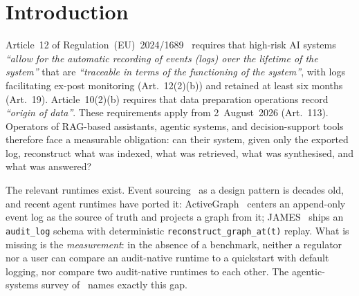 \documentclass[11pt,a4paper]{article}
\begin{document}
\begin{abstract}
DOI~\href{https://doi.org/10.5281/zenodo.20635130}{10.5281/zenodo.20635130}; both are reproducible bit-for-bit from the JAMES repository (tag \texttt{v0.4.3} for the software archive; commit \texttt{753022b} for the scenario-S2 measurement).
\end{abstract}

\section{Introduction}
\label{sec:intro}

Article~12 of Regulation~(EU)~2024/1689~\cite{aiact2024} requires that high-risk AI systems \emph{``allow for the automatic recording of events (logs) over the lifetime of the system''} that are \emph{``traceable in terms of the functioning of the system''}, with logs facilitating ex-post monitoring (Art.~12(2)(b)) and retained at least six months (Art.~19). Article~10(2)(b) requires that data preparation operations record \emph{``origin of data''}. These requirements apply from 2~August~2026 (Art.~113). Operators of RAG-based assistants, agentic systems, and decision-support tools therefore face a measurable obligation: can their system, given only the exported log, reconstruct what was indexed, what was retrieved, what was synthesised, and what was answered?

The relevant runtimes exist. Event sourcing~\cite{eventsourcing} as a design pattern is decades old, and recent agent runtimes have ported it: ActiveGraph~\cite{nakajima2026activegraph} centers an append-only event log as the source of truth and projects a graph from it; JAMES~\cite{seo2026jamesv043} ships an \texttt{audit\_log} schema with deterministic \texttt{reconstruct\_graph\_at(t)} replay. What is missing is the \emph{measurement}: in the absence of a benchmark, neither a regulator nor a user can compare an audit-native runtime to a quickstart with default logging, nor compare two audit-native runtimes to each other. The agentic-systems survey of~\cite{wang2026evidencetrace} names exactly this gap.
\end{document}
